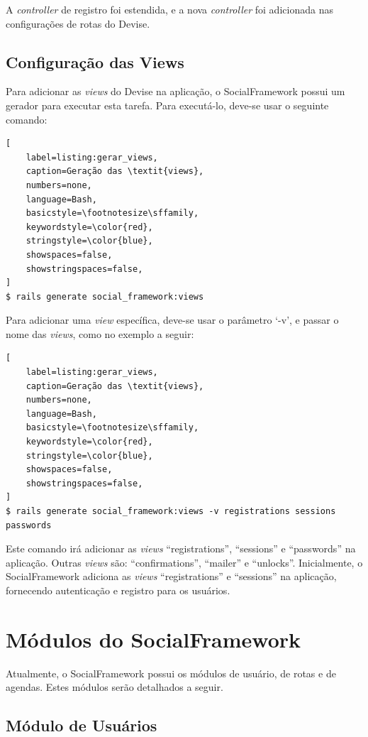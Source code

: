 A \textit{controller} de registro foi estendida, e a nova \textit{controller} foi adicionada nas configurações de rotas do Devise.

\subsection{Configuração das Views}

Para adicionar as \textit{views} do Devise na aplicação, o SocialFramework possui um gerador para executar esta tarefa. Para executá-lo, deve-se usar o seguinte comando:

\begin{lstlisting}[
    label=listing:gerar_views,
    caption=Geração das \textit{views},
    numbers=none,
    language=Bash,
    basicstyle=\footnotesize\sffamily,
    keywordstyle=\color{red},
    stringstyle=\color{blue},
    showspaces=false,
    showstringspaces=false,
]
$ rails generate social_framework:views
\end{lstlisting}

Para adicionar uma \textit{view} específica, deve-se usar o parâmetro `-v', e passar o nome das \textit{views}, como no exemplo a seguir:

\begin{lstlisting}[
    label=listing:gerar_views,
    caption=Geração das \textit{views},
    numbers=none,
    language=Bash,
    basicstyle=\footnotesize\sffamily,
    keywordstyle=\color{red},
    stringstyle=\color{blue},
    showspaces=false,
    showstringspaces=false,
]
$ rails generate social_framework:views -v registrations sessions passwords
\end{lstlisting}

Este comando irá adicionar as \textit{views} ``registrations'', ``sessions'' e ``passwords'' na aplicação. Outras \textit{views} são: ``confirmations'', ``mailer'' e ``unlocks''. Inicialmente, o SocialFramework adiciona as \textit{views} ``registrations'' e ``sessions'' na aplicação, fornecendo autenticação e registro para os usuários.

\section{Módulos do SocialFramework}
\label{sec:modulos_socialframework}

Atualmente, o SocialFramework possui os módulos de usuário, de rotas e de agendas. Estes módulos serão detalhados a seguir.

\subsection{Módulo de Usuários}

